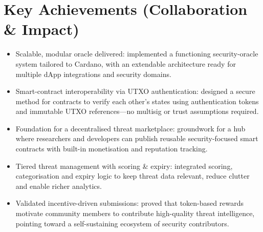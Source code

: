 \documentclass[11pt,a4paper]{article}
\begin{document}
\section*{Key Achievements (Collaboration \& Impact)}
\begin{itemize}
  \item Scalable, modular oracle delivered: implemented a functioning security-oracle system tailored to Cardano, with an extendable architecture ready for multiple dApp integrations and security domains.
  \item Smart-contract interoperability via UTXO authentication: designed a secure method for contracts to verify each other’s states using authentication tokens and immutable UTXO references---no multisig or trust assumptions required.
  \item Foundation for a decentralised threat marketplace: groundwork for a hub where researchers and developers can publish reusable security-focused smart contracts with built-in monetisation and reputation tracking.
  \item Tiered threat management with scoring \& expiry: integrated scoring, categorisation and expiry logic to keep threat data relevant, reduce clutter and enable richer analytics.
  \item Validated incentive-driven submissions: proved that token-based rewards motivate community members to contribute high-quality threat intelligence, pointing toward a self-sustaining ecosystem of security contributors.
\end{itemize}
\end{document}
